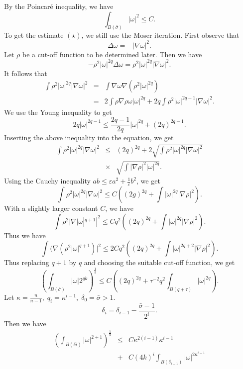 By the Poincar\'{e} inequality, we have
%
\[ \int_{B(\bar{\sigma})} | \omega |^2 \leq C .\]
%
To get the estimate $(\star)$, we still use the Moser iteration. First observe that 
%
\[ \Delta \omega = - | \nabla \omega |^2.\]
%
Let $ \rho $ be a cut-off function to be determined later. Then we have
%
\[ - \rho ^2 |\omega |^{2 q} \Delta \omega = \rho^2 | \omega |^{2q} | \nabla \omega |^2 .\]
%
It follows that 
%
\begin{eqnarray*}
\int \rho^2 |\omega |^{2q} |\nabla \omega | ^2 & = & \int \nabla \omega \nabla ( \rho^2 |\omega |^{2q})\\
& = & 2 \int \rho \nabla \rho \omega |\omega |^{2q} + 2 q \int \rho^2 |\omega | ^{2q-1} |\nabla \omega |^2. \end{eqnarray*}
%
We use the Young inequality to get  
%
\begin{equation} 2q |\omega |^{2q-1} \leq \frac{2q-1}{2q} |\omega | ^{2q} + ( 2q) ^{2q-1} .\tag{$\triangle$}\end{equation}
%
Inserting the above inequality into the equation, we get 
%
\begin{eqnarray*}
\int \rho ^2 |\omega |^{2q} |\nabla \omega |^2 & \leq & (2q)^{2q} + 2 \sqrt{\int \rho^2 |\omega |^{2q} | \nabla \omega |^2}\\
& \times & \sqrt{\int   |\nabla \rho |^{2} | \omega  |^{2q} }.
\end{eqnarray*}
Using the Cauchy inequality $ ab \leq \varepsilon a^2 + \frac{1}{\varepsilon} b^2$, we get 
%
\[ \int \rho^2 |\omega |^{2q} |\nabla \omega |^2 \leq C (( 2g) ^{2q} + \int |\omega | ^{2q} | \nabla \rho |^2) .\]
%
With a slightly larger constant $C$, we have 
%
\[ \int \rho^2 |\nabla | \omega | ^{q+1} |^2  \leq C  q^2 (( 2q)^{2q} + \int |\omega | ^{2q} | \nabla \rho |^2).\]
%
Thus we have 
%
\[ \int (\nabla ( \rho^2 |\omega |^{q+1}) |^2 \leq 2 C q^2((2q) ^{2q} + \int |\omega | ^{2q+2} | \nabla \rho |^2) .\]
%
Thus replacing $ q + 1 $ by $q$ and choosing the suitable cut-off function, we get 
%
\[\left( \int _{B(\bar{\sigma})} |\omega |  {2^{qk}} \right) ^{\frac{1}{k}} \leq C \left(( 2q) ^{2q} + \tau ^{-2} q ^2 \int _{B(q + \tau)} |\omega | ^{2q}\right).\]
%
Let $ \kappa = \frac{n}{n-1}, \; q_i = \kappa ^{i-1} , \; \delta_0  = \bar{\sigma} > 1$.
%
\[ \delta _i = \delta _{i-1} - \frac{\bar{\sigma} - 1}{2^i}.\]
Then we have
%
\begin{eqnarray*}
\left( \int_{B(\delta i)} | \omega |^{2 +1}\right) ^{\frac{1}{k}}&\leq & C \kappa ^{2(i-1)} \kappa^{i-1}\\
&+ & C (4 k )^i \int _{B (\delta _{i-1})} |\omega |^{2\kappa ^{i-1}}
\end{eqnarray*}
